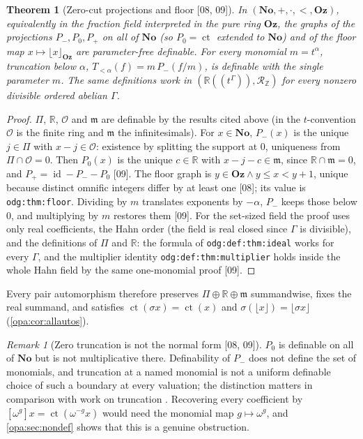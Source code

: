 \documentclass[11pt,oneside]{article}
\numberwithin{equation}{section}
\newtheorem{theorem}{Theorem}[section]
\theoremstyle{definition}
\theoremstyle{remark}
\newtheorem{remark}[remark]{Remark}
\newcommand{\No}{\mathbf{No}}
\newcommand{\Oz}{\mathbf{Oz}}
\newcommand{\R}{\mathbb R}
\newcommand{\Z}{\mathbb Z}
\newcommand{\OO}{\mathcal O}
\newcommand{\mm}{\mathfrak m}
\newcommand{\ct}{\operatorname{ct}}
\newcommand{\id}{\operatorname{id}}
\newcommand{\Hahn}[2]{#1((t^{#2}))}
\newcommand{\src}[1]{\textup{\textsf{\small[#1]}}}
\newcommand{\lbl}[1]{\nolinkurl{#1}}
\begin{document}
\begin{theorem}[Zero-cut projections and floor \src{08, 09}]\label{opa:thm:projections}
In $(\No,+,\cdot,<,\Oz)$, equivalently in the fraction field interpreted in the
pure ring $\Oz$, the graphs of the projections $P_-,P_0,P_+$ on all of $\No$
(so $P_0=\ct$ extended to $\No$) and of the floor map $x\mapsto\lfloor x\rfloor_\Oz$
are parameter-free definable. For every monomial $m=t^\alpha$, truncation below
$\alpha$, $T_{<\alpha}(f)=m\,P_-(f/m)$, is definable with the single parameter $m$.
The same definitions work in $(\Hahn\R\Gamma,\mathcal R_\Z)$ for every nonzero
divisible ordered abelian $\Gamma$.
\end{theorem}
\begin{proof}
$\Pi$, $\R$, $\OO$ and $\mm$ are definable by the results cited above (in the
$t$-convention $\OO$ is the finite ring and $\mm$ the infinitesimals). For $x\in\No$,
$P_-(x)$ is the unique $j\in\Pi$ with $x-j\in\OO$: existence by splitting the
support at $0$, uniqueness from $\Pi\cap\OO=0$. Then $P_0(x)$ is the unique $c\in\R$
with $x-j-c\in\mm$, since $\R\cap\mm=0$, and $P_+=\id-P_--P_0$ \src{09}. The floor
graph is $y\in\Oz\wedge y\le x<y+1$, unique because distinct omnific integers
differ by at least one \src{08}; its value is \lbl{odg:thm:floor}. Dividing by
$m$ translates exponents by $-\alpha$, $P_-$ keeps those below $0$, and
multiplying by $m$ restores them \src{09}. For the set-sized field the proof uses
only real coefficients, the Hahn order (the field is real closed since
$\Gamma$ is divisible), and the definitions of $\Pi$ and $\R$: the formula of
\lbl{odg:def:thm:ideal} works for every $\Gamma$, and the multiplier identity
\lbl{odg:def:thm:multiplier} holds inside the whole Hahn field by the same
one-monomial proof \src{09}.
\end{proof}

Every pair automorphism therefore preserves $\Pi\oplus\R\oplus\mm$ summandwise,
fixes the real summand, and satisfies $\ct(\sigma x)=\ct(x)$ and
$\sigma(\lfloor x\rfloor)=\lfloor\sigma x\rfloor$ (\cref{opa:cor:allautos}).

\begin{remark}[Zero truncation is not the normal form \src{08, 09}]\label{opa:rem:zerotruncation}
$P_0$ is definable on all of $\No$ but is not multiplicative there. Definability of
$P_-$ does not define the set of monomials, and truncation at a named monomial is
not a uniform definable choice of such a boundary at every valuation; the
distinction matters in comparison with work on truncation \cite{Camacho}.
Recovering every coefficient by $[\omega^g]x=\ct(\omega^{-g}x)$ would need the
monomial map $g\mapsto\omega^g$, and \cref{opa:sec:nondef} shows that this is a genuine
obstruction.
\end{remark}
\end{document}

